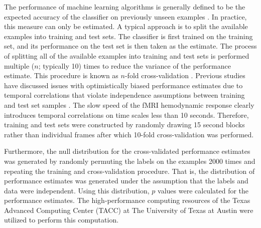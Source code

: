 \documentclass[5p,authoryear]{elsarticle}
\begin{document}
The performance of machine learning algorithms is generally defined to be the expected accuracy of the classifier on previously unseen examples \citep{Bishop2006}.
In practice, this measure can only be estimated.
A typical approach is to split the available examples into training and test sets.
The classifier is first trained on the training set, and its performance on the test set is then taken as the estimate.
The process of splitting all of the available examples into training and test sets is performed multiple ($n$; typically 10) times to reduce the variance of the performance estimate.
This procedure is known as $n$-fold cross-validation \citep{Kohavi1995}.
Previous studies have discussed issues with optimistically biased performance estimates due to temporal correlations that violate independence assumptions between training and test set samples \citep{Pereira2009}. 
The slow speed of the fMRI hemodynamic response clearly introduces temporal correlations on time scales less than 10 seconds.
Therefore, training and test sets were constructed by randomly drawing 15 second blocks rather than individual frames after which 10-fold cross-validation was performed.

Furthermore, the null distribution for the cross-validated performance estimates was generated by randomly permuting the labels on the examples 2000 times and repeating the training and cross-validation procedure.
That is, the distribution of performance estimates was generated under the assumption that the labels and data were independent.
Using this distribution, $p$ values were calculated for the performance estimates.
The high-performance computing resources of the Texas Advanced Computing Center (TACC) at The University of Texas at Austin were utilized to perform this computation.

\end{document}
